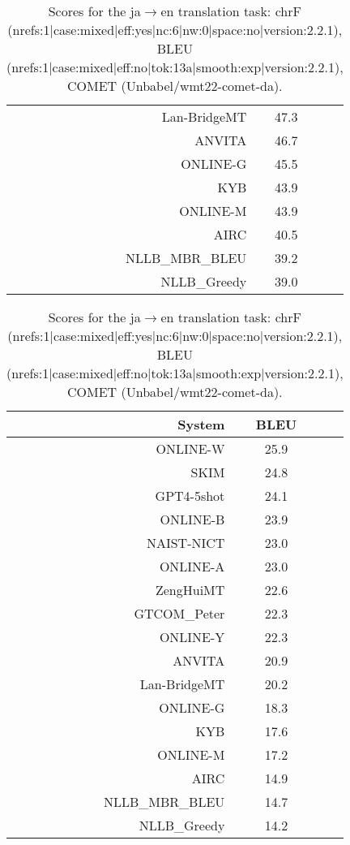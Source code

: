 \documentclass[11pt]{article}
\begin{document}
\begin{table}
\begin{subtable}[t]{0.33\textwidth}
\begin{tabular}{rcc}
\rowcolor{ashgrey} Lan-BridgeMT  & 47.3 \\ 
ANVITA  & 46.7 \\ 
\rowcolor{ashgrey} ONLINE-G  & 45.5 \\ 
\rowcolor{ashgrey} KYB  & 43.9 \\ 
\rowcolor{ashgrey} ONLINE-M  & 43.9 \\ 
AIRC  & 40.5 \\ 
\rowcolor{ashgrey} NLLB\_MBR\_BLEU  & 39.2 \\ 
\rowcolor{ashgrey} NLLB\_Greedy  & 39.0 \\ 
\bottomrule 
\end{tabular} 
\end{subtable} 
\begin{subtable}[t]{0.33\textwidth}
\begin{tabular}{rcc}
\toprule 
System  & BLEU \\ 
\midrule 
\rowcolor{ashgrey} ONLINE-W  & 25.9 \\ 
SKIM & 24.8 \\ 
\rowcolor{ashgrey} GPT4-5shot  & 24.1 \\ 
\rowcolor{ashgrey} ONLINE-B  & 23.9 \\ 
NAIST-NICT  & 23.0 \\ 
\rowcolor{ashgrey} ONLINE-A  & 23.0 \\ 
\rowcolor{ashgrey} ZengHuiMT  & 22.6 \\ 
\rowcolor{ashgrey} GTCOM\_Peter  & 22.3 \\ 
\rowcolor{ashgrey} ONLINE-Y  & 22.3 \\ 
ANVITA  & 20.9 \\ 
\rowcolor{ashgrey} Lan-BridgeMT  & 20.2 \\ 
\rowcolor{ashgrey} ONLINE-G  & 18.3 \\ 
\rowcolor{ashgrey} KYB  & 17.6 \\ 
\rowcolor{ashgrey} ONLINE-M  & 17.2 \\ 
AIRC & 14.9 \\ 
\rowcolor{ashgrey} NLLB\_MBR\_BLEU  & 14.7 \\ 
\rowcolor{ashgrey} NLLB\_Greedy  & 14.2 \\ 
\bottomrule 
\end{tabular} 
\end{subtable} 
\caption{Scores for the ja$\rightarrow$en translation task: chrF (nrefs:1|case:mixed|eff:yes|nc:6|nw:0|space:no|version:2.2.1), BLEU (nrefs:1|case:mixed|eff:no|tok:13a|smooth:exp|version:2.2.1), COMET (Unbabel/wmt22-comet-da).} 
\end{table} 
\end{document}
